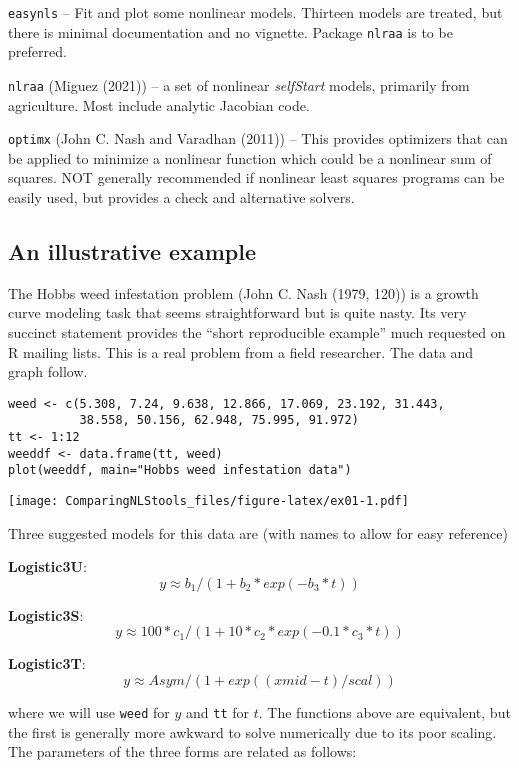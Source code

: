 \texttt{easynls} -- Fit and plot some nonlinear models. Thirteen models are treated, but
there is minimal documentation and no vignette. Package \texttt{nlraa} is to be preferred.

\texttt{nlraa} (Miguez (2021)) -- a set of nonlinear \emph{selfStart} models, primarily from
agriculture. Most include analytic Jacobian code.

\texttt{optimx} (John C. Nash and Varadhan (2011)) -- This provides
optimizers that can be applied to minimize a nonlinear function which could be
a nonlinear sum of
squares. NOT generally recommended if nonlinear
least squares programs can be easily used, but provides a check and alternative
solvers.

\hypertarget{an-illustrative-example}{%
\subsection{An illustrative example}\label{an-illustrative-example}}

The Hobbs weed infestation problem (John C. Nash (1979, 120)) is a growth curve modeling
task that seems straightforward but is quite nasty. Its very succinct statement
provides the ``short reproducible example'' much requested on R mailing lists.
This is a real problem from a field researcher. The data and graph follow.

\begin{verbatim}
weed <- c(5.308, 7.24, 9.638, 12.866, 17.069, 23.192, 31.443,
          38.558, 50.156, 62.948, 75.995, 91.972)
tt <- 1:12
weeddf <- data.frame(tt, weed)
plot(weeddf, main="Hobbs weed infestation data")
\end{verbatim}

\texttt{[image: ComparingNLStools\_files/figure-latex/ex01-1.pdf]}

Three suggested models for this data are (with names to allow for easy reference)

\textbf{Logistic3U}:
\[  y \approx  b_1 / (1 + b_2 * exp(- b_3 * t)) \]

\textbf{Logistic3S}:
\[ y \approx  100 * c_1 / (1 + 10 * c_2 * exp(- 0.1 * c_3 * t)) \]

\textbf{Logistic3T}:
\[ y \approx Asym / (1 + exp((xmid - t)/scal)) \]

where we will use \texttt{weed} for \(y\) and \texttt{tt} for \(t\).
The functions above are equivalent, but the first is generally more awkward
to solve numerically due to its poor scaling. The parameters of the three forms
are related as follows:

